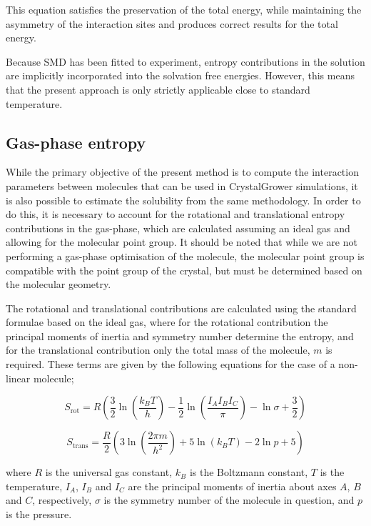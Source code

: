\documentclass[twoside,twocolumn,9pt]{article}
\begin{document}
This equation satisfies the preservation of the total energy, while maintaining the asymmetry of the
interaction sites and produces correct results for the total energy.

Because SMD has been fitted to experiment, entropy contributions in the solution are implicitly 
incorporated into the solvation free energies. However, this means that the present approach is 
only strictly applicable close to standard temperature.

\subsection{Gas-phase entropy}

While the primary objective of the present method is to compute the interaction parameters between 
molecules that can be used in CrystalGrower simulations, it is also possible to estimate the solubility 
from the same methodology. In order to do this, it is necessary to account for the rotational and 
translational entropy contributions in the gas-phase, which are calculated assuming an ideal gas and 
allowing for the molecular point group. It should be noted that while we are not performing a gas-phase 
optimisation of the molecule, the molecular point group is compatible with the 
point group of the crystal, but must be determined based on the molecular geometry.

The rotational and translational contributions are calculated using the standard formulae based on the 
ideal gas, where for the rotational contribution the principal moments of inertia and symmetry number
determine the entropy, and for the translational contribution only the total mass of the molecule, 
$m$ is required. These terms are given by the following equations for the case of a non-linear molecule;

\begin{equation}
    S_{\textrm{rot}} = R(\frac{3}{2} \ln(\frac{k_{B}T}{h}) - \frac{1}{2} \ln(\frac{I_A I_B I_C}{\pi}) - \ln \sigma + \frac{3}{2})
\end{equation}

\begin{equation}
    S_{\textrm{trans}} = \frac{R}{2} (3 \ln(\frac{2 \pi m}{h^2}) + 5 \ln(k_{B}T) - 2 \ln p + 5)
\end{equation}

where $R$ is the universal gas constant, $k_{B}$ is the Boltzmann constant, $T$ is the temperature,
$I_A$, $I_B$ and $I_C$ are the principal moments of inertia about axes $A$, $B$ and $C$, respectively,
$\sigma$ is the symmetry number of the molecule in question, and $p$ is the pressure.
\end{document}
